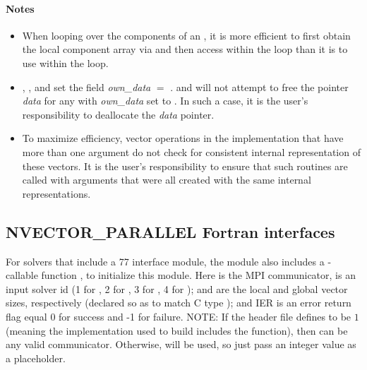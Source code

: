 \paragraph{\bf Notes}

\begin{itemize}

\item
  When looping over the components of an  , it is
  more efficient to first obtain the local component array via
   and then access  within the
  loop than it is to use  within the loop.

\item
  {\warn}, ,
  and  set the field
  {\em own\_data} $=$ .
   and 
  will not attempt to free the pointer {\em data} for any  with
  {\em own\_data} set to . In such a case, it is the user's responsibility to
  deallocate the {\em data} pointer.

\item
  {\warn}To maximize efficiency, vector operations in the {\nvecp} implementation
  that have more than one  argument do not check for
  consistent internal representation of these vectors. It is the user's
  responsibility to ensure that such routines are called with 
  arguments that were all created with the same internal representations.

\end{itemize}


\subsection{NVECTOR\_PARALLEL Fortran interfaces}
\label{ss:nvec_par_fortran}

For solvers that include a {\F} 77 interface module, the {\nvecp} module
also includes a {\F}-callable function
,
to initialize this {\nvecp} module.  Here  is the MPI communicator,
 is an input solver id (1 for {\cvode}, 2 for {\ida}, 3 for {\kinsol},
4 for {\arkode});  and  are the local and global
vector sizes, respectively (declared so as to match C type );
and IER is an error return flag equal 0 for success and -1 for failure.
{\warn}NOTE: If the header file  defines
 to be $1$ (meaning the {\mpi}
implementation used to build {\sundials} includes the
 function), then  can be any valid
{\mpi} communicator. Otherwise,  will be used, so
just pass an integer value as a placeholder.
